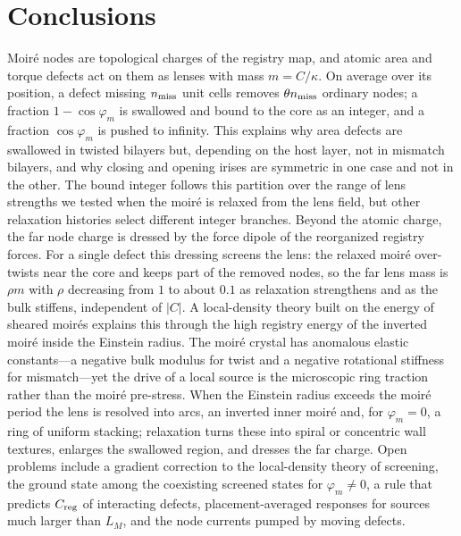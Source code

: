 \documentclass[prb,twocolumn,superscriptaddress,floatfix,10pt]{revtex4-2}
\begin{document}
\section{Conclusions}\label{sec:concl}

Moir\'e nodes are topological charges of the registry map, and atomic area and torque defects act on them as lenses with mass $m=C/\kappa$. On average over its position, a defect missing $n_{\rm miss}$ unit cells removes $\theta n_{\rm miss}$ ordinary nodes; a fraction $1-\cos\varphi_m$ is swallowed and bound to the core as an integer, and a fraction $\cos\varphi_m$ is pushed to infinity. This explains why area defects are swallowed in twisted bilayers but, depending on the host layer, not in mismatch bilayers, and why closing and opening irises are symmetric in one case and not in the other. The bound integer follows this partition over the range of lens strengths we tested when the moir\'e is relaxed from the lens field, but other relaxation histories select different integer branches. Beyond the atomic charge, the far node charge is dressed by the force dipole of the reorganized registry forces. For a single defect this dressing screens the lens: the relaxed moir\'e over-twists near the core and keeps part of the removed nodes, so the far lens mass is $\rho m$ with $\rho$ decreasing from $1$ to about $0.1$ as relaxation strengthens and as the bulk stiffens, independent of $|C|$. A local-density theory built on the energy of sheared moir\'es explains this through the high registry energy of the inverted moir\'e inside the Einstein radius. The moir\'e crystal has anomalous elastic constants---a negative bulk modulus for twist and a negative rotational stiffness for mismatch---yet the drive of a local source is the microscopic ring traction rather than the moir\'e pre-stress. When the Einstein radius exceeds the moir\'e period the lens is resolved into arcs, an inverted inner moir\'e and, for $\varphi_m=0$, a ring of uniform stacking; relaxation turns these into spiral or concentric wall textures, enlarges the swallowed region, and dresses the far charge. Open problems include a gradient correction to the local-density theory of screening, the ground state among the coexisting screened states for $\varphi_m\neq0$, a rule that predicts $C_{\rm reg}$ of interacting defects, placement-averaged responses for sources much larger than $L_M$, and the node currents pumped by moving defects.
\end{document}
